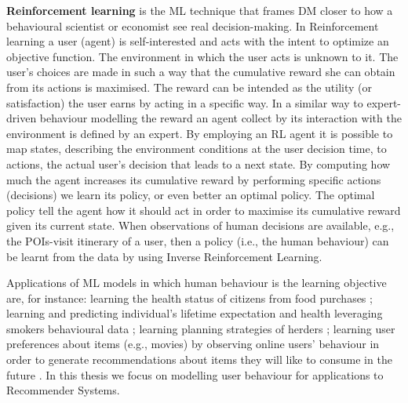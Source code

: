 \noindent\textbf{Reinforcement learning} \cite{sutton:1998} is the ML technique that frames DM closer to how a behavioural scientist or economist see real decision-making. In Reinforcement learning a user 
(agent) is self-interested and acts with the intent to optimize an objective function. 
The environment in which the user acts is unknown to it. The user's choices are made in such a way that the cumulative reward she can obtain from its actions is maximised. The reward can be intended as the utility (or satisfaction) the user earns by acting in a specific way. In a similar way to expert-driven behaviour modelling the reward an agent collect by its interaction with the environment is defined by an expert. By employing an RL agent it is possible to map states, describing the environment conditions at the user decision time, to actions, the actual user's decision that leads to a next state.
By computing how much the agent increases its cumulative reward by performing specific actions (decisions) we learn its policy, 
or even better an optimal policy. The optimal policy tell the agent how it should act in order to maximise its cumulative reward given its current state.
When observations of human decisions are available, e.g., the POIs-visit itinerary of a user, then a policy (i.e., the human behaviour) can be learnt from the data by using Inverse Reinforcement Learning. 

Applications of ML models in which human behaviour is the learning objective are, for instance: learning the health status of citizens from food purchases \cite{health:aiello:2019}; learning and predicting individual's lifetime expectation and health leveraging smokers behavioural data \cite{smokers:darden:2017}; learning planning strategies of herders \cite{ermon:2015}; learning user preferences about items (e.g., movies) by observing online users' behaviour in order to generate recommendations about items they will like to consume in the future \cite{RSdef:2015}.
In this thesis we focus on modelling user behaviour for applications to Recommender Systems.

